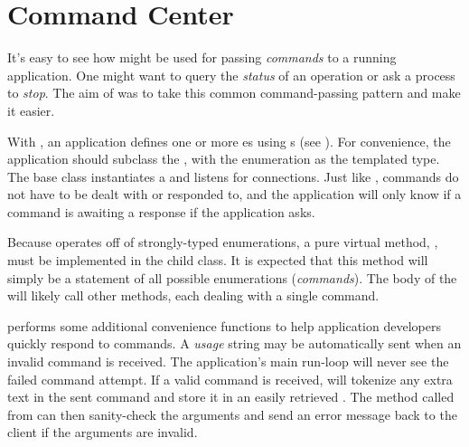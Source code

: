 \section{Command Center}
\label{sec_messaging_command-center}

It's easy to see how  might be used for passing
\textit{commands} to a running application. One might want to query the
\textit{status} of an operation or ask a process to \textit{stop}. The aim of
 was to take this common command-passing pattern and
make it easier.

With , an application defines one or more
es using s (see
).  For convenience, the application 
should subclass the  , with the
enumeration as the templated type. The base class
instantiates a  and listens for connections.
Just like
, commands do not have to be dealt with or responded to,
and the application will only know if a command is awaiting a response if 
the application asks. 

Because  operates off of strongly-typed enumerations,
a pure virtual method, , must be implemented
in the  child class. It is expected that this method will simply be a
statement of all possible enumerations (\textit{commands}). The body of 
the  will likely call other methods, each dealing with a single
command.

 performs some additional convenience functions to help
application developers quickly respond to commands. A \textit{usage} string
may be automatically sent when an invalid command is received. The
application's main run-loop will never see the failed command attempt. If a
valid command is received,  will tokenize any extra text
in the sent command and store it in an easily retrieved .
The method called from  can then sanity-check the
arguments and send an error message back to the client if the arguments are
invalid.

